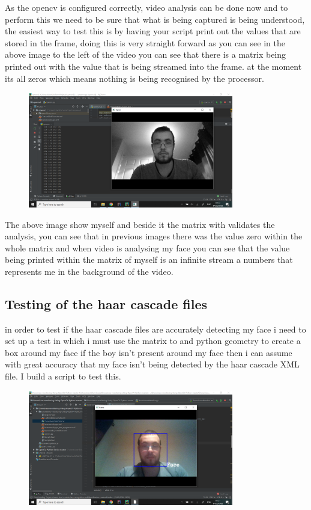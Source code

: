 As the opencv is configured correctly, video analysis can be done now and to perform this we need to be sure that what is being captured is being understood, the easiest way to test this is by having your script print out the values that are stored in the frame, doing this is very straight forward as you can see in the above image to the left of the video you can see that there is a matrix being printed out with the value that is being streamed into the frame. at the moment its all zeros which means nothing is being recognised by the processor. 
\begin{figure}[h]
\includegraphics[width=0.8\textwidth]{Figures/videoanlysis.png}
\end{figure}
The above image show myself and beside it the matrix with validates the analysis, you can see that in previous images there was the value zero within the whole matrix and when video is analysing my face you can see that the value being printed within the matrix of myself is an infinite stream a numbers that represents me in the background of the video.
 
\subsection{Testing of the haar cascade files}
in order to test if the haar cascade files are accurately detecting my face i need to set up a test in which i must use the matrix to and python geometry to create a box around my face if the boy isn't present around my face then i can assume with great accuracy that my face isn't being detected by the haar cascade XML file. I build a script to test this.   
\begin{figure}[h]
\includegraphics[width=0.8\textwidth]{Figures/facedetect.png}
\end{figure}

